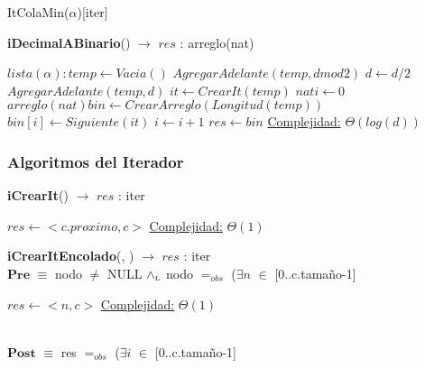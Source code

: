 \begin{Estructura}{ItColaMin($\alpha$)}[iter]
\begin{algorithm}[H]{\textbf{iDecimalABinario}{(}) $\to$ $res$ : arreglo(nat)}
   	\begin{algorithmic}[1]
		\State $lista(\alpha): temp \gets Vacia() $ 
			\State $AgregarAdelante(temp, d mod 2)$ 			
			\State $d \gets d/2$ 			
		\EndWhile
		\State $AgregarAdelante(temp, d)$ 
		\State $it \gets CrearIt(temp)$ 					
		\State $nat i \gets 0$ 
		\State $arreglo(nat) bin \gets CrearArreglo(Longitud(temp)) $ 		
			\State $bin[i] \gets Siguiente(it)$ 			
			\State $i \gets i+1$ 			
		\EndWhile
		\State $res \gets bin$ 
		\Statex \underline{Complejidad:} $\Theta(log(d))$
   	\end{algorithmic}
\end{algorithm}    

\subsubsection{Algoritmos del Iterador}

\begin{algorithm}[H]{\textbf{iCrearIt}() $\to$ $res$ : iter}
   	\begin{algorithmic}[1]
			\State $res \gets <c.proximo, c>$ 
			\Statex \underline{Complejidad:} $\Theta(1)$
   	\end{algorithmic}
\end{algorithm}    	

\begin{algorithm}[H]{\textbf{iCrearItEncolado}(, ) $\to$ $res$ : iter} 
	{\\ $\textbf{Pre}$ $\equiv$ nodo $\neq$ NULL $\land_{\mathrm{\scriptscriptstyle{L}}}$ nodo $=_{obs}$ ($\exists n$ $\in$ [0..c.tamaño-1] }
   	\begin{algorithmic}[1]
			\State $res \gets <n, c>$ 
			\Statex \underline{Complejidad:} $\Theta(1)$
   	\end{algorithmic}
   	{\\ $\textbf{Post}$ $\equiv$ res $=_{obs}$ ($\exists i$ $\in$ [0..c.tamaño-1] }
\end{algorithm}    	



\end{Estructura}
